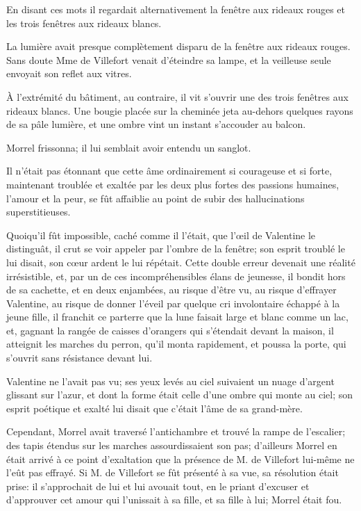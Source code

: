 En disant ces mots il regardait alternativement la fenêtre aux rideaux rouges et les trois fenêtres aux rideaux blancs. 

La lumière avait presque complètement disparu de la fenêtre aux rideaux rouges. Sans doute Mme de Villefort venait d'éteindre sa lampe, et la veilleuse seule envoyait son reflet aux vitres. 

À l'extrémité du bâtiment, au contraire, il vit s'ouvrir une des trois fenêtres aux rideaux blancs. Une bougie placée sur la cheminée jeta au-dehors quelques rayons de sa pâle lumière, et une ombre vint un instant s'accouder au balcon. 

Morrel frissonna; il lui semblait avoir entendu un sanglot. 

Il n'était pas étonnant que cette âme ordinairement si courageuse et si forte, maintenant troublée et exaltée par les deux plus fortes des passions humaines, l'amour et la peur, se fût affaiblie au point de subir des hallucinations superstitieuses.  

Quoiqu'il fût impossible, caché comme il l'était, que l'œil de Valentine le distinguât, il crut se voir appeler par l'ombre de la fenêtre; son esprit troublé le lui disait, son cœur ardent le lui répétait. Cette double erreur devenait une réalité irrésistible, et, par un de ces incompréhensibles élans de jeunesse, il bondit hors de sa cachette, et en deux enjambées, au risque d'être vu, au risque d'effrayer Valentine, au risque de donner l'éveil par quelque cri involontaire échappé à la jeune fille, il franchit ce parterre que la lune faisait large et blanc comme un lac, et, gagnant la rangée de caisses d'orangers qui s'étendait devant la maison, il atteignit les marches du perron, qu'il monta rapidement, et poussa la porte, qui s'ouvrit sans résistance devant lui. 

Valentine ne l'avait pas vu; ses yeux levés au ciel suivaient un nuage d'argent glissant sur l'azur, et dont la forme était celle d'une ombre qui monte au ciel; son esprit poétique et exalté lui disait que c'était l'âme de sa grand-mère. 

Cependant, Morrel avait traversé l'antichambre et trouvé la rampe de l'escalier; des tapis étendus sur les marches assourdissaient son pas; d'ailleurs Morrel en était arrivé à ce point d'exaltation que la présence de M. de Villefort lui-même ne l'eût pas effrayé. Si M. de Villefort se fût présenté à sa vue, sa résolution était prise: il s'approchait de lui et lui avouait tout, en le priant d'excuser et d'approuver cet amour qui l'unissait à sa fille, et sa fille à lui; Morrel était fou. 

